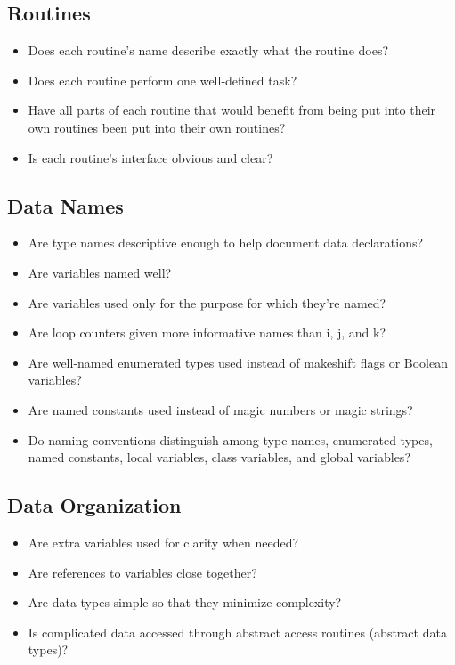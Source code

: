 \subsection{Routines}
\begin{itemize}
\item Does each routine’s name describe exactly what the routine does?
\item Does each routine perform one well-defined task?
\item Have all parts of each routine that would benefit from being put into their own routines been put into their own routines?
\item Is each routine’s interface obvious and clear?
\end{itemize}

\subsection{Data Names}
\begin{itemize}
\item Are type names descriptive enough to help document data declarations?
\item Are variables named well?
\item Are variables used only for the purpose for which they’re named?
\item Are loop counters given more informative names than i, j, and k?
\item Are well-named enumerated types used instead of makeshift flags or Boolean variables?
\item Are named constants used instead of magic numbers or magic strings?
\item Do naming conventions distinguish among type names, enumerated types, named constants, local variables, class variables, and global variables?
\end{itemize}

\subsection{Data Organization}
\begin{itemize}
\item Are extra variables used for clarity when needed?
\item Are references to variables close together?
\item Are data types simple so that they minimize complexity?
\item Is complicated data accessed through abstract access routines (abstract data types)?
\end{itemize}


